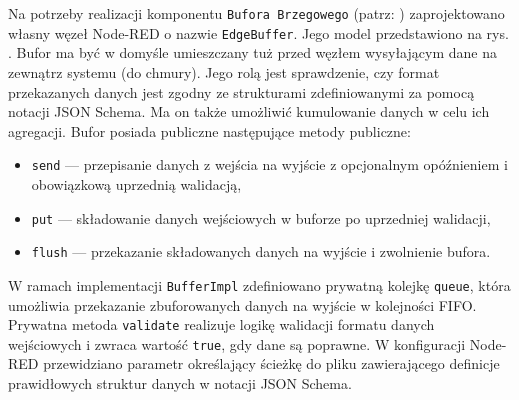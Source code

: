 \documentclass[a4paper, 12pt, twoside]{article}
\begin{document}
Na potrzeby realizacji komponentu \texttt{Bufora Brzegowego} (patrz: )
zaprojektowano własny węzeł Node-RED o nazwie \texttt{EdgeBuffer}.
Jego model przedstawiono na rys. .
Bufor ma być w domyśle umieszczany tuż przed węzłem wysyłającym dane na
zewnątrz systemu (do chmury). Jego rolą jest sprawdzenie, czy format
przekazanych danych jest zgodny ze strukturami zdefiniowanymi za pomocą notacji JSON Schema. 
Ma on także umożliwić
kumulowanie danych w celu ich agregacji. Bufor posiada publiczne następujące
metody publiczne:
\begin{itemize}
      \itemsep0em
      \item \texttt{send} --- przepisanie danych z wejścia na wyjście z
            opcjonalnym opóźnieniem i obowiązkową uprzednią walidacją,
      \item \texttt{put} --- składowanie danych wejściowych w buforze po uprzedniej walidacji,
      \item \texttt{flush} --- przekazanie składowanych danych na wyjście
            i zwolnienie bufora.
\end{itemize}
\noindent W ramach implementacji \texttt{BufferImpl} zdefiniowano
prywatną kolejkę \texttt{queue}, która umożliwia przekazanie zbuforowanych
danych na wyjście w kolejności FIFO. Prywatna metoda \texttt{validate} realizuje
logikę walidacji formatu danych wejściowych i zwraca wartość \texttt{true},
gdy dane są poprawne. W konfiguracji Node-RED przewidziano parametr określający
ścieżkę do pliku zawierającego definicje prawidłowych struktur danych w notacji JSON Schema.
\end{document}
